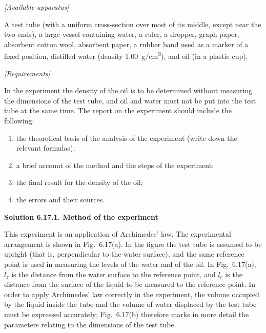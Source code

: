 \noindent\textit{[Available apparatus]}

A test tube (with a uniform cross-section over most of its middle, except near the two ends), a large vessel containing water, a ruler, a dropper, graph paper, absorbent cotton wool, absorbent paper, a rubber band used as a marker of a fixed position, distilled water (density \SI{1.00}{g/cm^3}), and oil (in a plastic cup).

\noindent\textit{[Requirements]}

In the experiment the density of the oil is to be determined without measuring the dimensions of the test tube, and oil and water must not be put into the test tube at the same time. The report on the experiment should include the following:
\begin{enumerate}[label=(\arabic*),leftmargin=2.2em,itemsep=1pt,topsep=2pt]
\item the theoretical basis of the analysis of the experiment (write down the relevant formulas);
\item a brief account of the method and the steps of the experiment;
\item the final result for the density of the oil;
\item the errors and their sources.
\end{enumerate}

\medskip
\noindent\textbf{Solution 6.17.}\quad \textbf{1. Method of the experiment}

This experiment is an application of Archimedes' law. The experimental arrangement is shown in Fig.~6.17(a). In the figure the test tube is assumed to be upright (that is, perpendicular to the water surface), and the same reference point is used in measuring the levels of the water and of the oil. In Fig.~6.17(a), $l_z$ is the distance from the water surface to the reference point, and $l_c$ is the distance from the surface of the liquid to be measured to the reference point. In order to apply Archimedes' law correctly in the experiment, the volume occupied by the liquid inside the tube and the volume of water displaced by the test tube must be expressed accurately; Fig.~6.17(b) therefore marks in more detail the parameters relating to the dimensions of the test tube.

